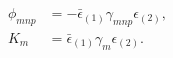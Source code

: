 \begin{equation}
\begin{aligned}
   \phi_{mnp} &= - \bar{\epsilon}_{(1)}\gamma_{mnp}\epsilon_{(2)} , \\
   K_m &= \bar{\epsilon}_{(1)}\gamma_m\epsilon_{(2)} .
\end{aligned}
\end{equation}

